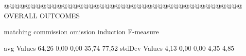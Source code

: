 @@@@@@@@@@@@@@@@@@@@@@@@@@@@@@@@@@@@@@@@@@@@@ OVERALL OUTCOMES

               matching commission   omission  induction  F-measure
               
avg Values      64,26       0,00       0,00      35,74     77,52        
stdDev Values    4,13       0,00       0,00       4,35      4,85        